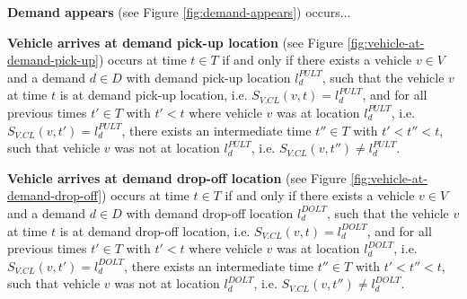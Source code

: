 \documentclass[graybox]{svmult}
\begin{document}
\noindent
\textbf{Demand appears} (see Figure \ref{fig:demand-appears}) occurs...

\vspace{4mm}

\noindent
\textbf{Vehicle arrives at demand pick-up location} (see Figure \ref{fig:vehicle-at-demand-pick-up}) 
occurs at time $t \in T$ if and only if there exists a vehicle $v \in V$ and a demand $d \in D$ with demand pick-up location $l_d^{PULT}$, such that the vehicle $v$ at time $t$ is at demand pick-up location, i.e. $S_{V.CL}(v, t) = l_d^{PULT}$, and for all previous times $t' \in T$ with $t' < t$ where vehicle $v$ was at location $l_d^{PULT}$, i.e. $S_{V.CL}(v, t') = l_d^{PULT}$, there exists an intermediate time $t'' \in T$ with $t' < t'' < t$, such that vehicle $v$ was not at location $l_d^{PULT}$, i.e. $S_{V.CL}(v, t'') \neq l_d^{PULT}$.


\vspace{4mm}

\noindent
\textbf{Vehicle arrives at demand drop-off location} (see Figure \ref{fig:vehicle-at-demand-drop-off})
occurs at time $t \in T$ if and only if there exists a vehicle $v \in V$ and a demand $d \in D$ with demand drop-off location $l_d^{DOLT}$, such that the vehicle $v$ at time $t$ is at demand drop-off location, i.e. $S_{V.CL}(v, t) = l_d^{DOLT}$, and for all previous times $t' \in T$ with $t' < t$ where vehicle $v$ was at location $l_d^{DOLT}$, i.e. $S_{V.CL}(v, t') = l_d^{DOLT}$, there exists an intermediate time $t'' \in T$ with $t' < t'' < t$, such that vehicle $v$ was not at location $l_d^{DOLT}$, i.e. $S_{V.CL}(v, t'') \neq l_d^{DOLT}$.

\vspace{-2mm}
\end{document}

